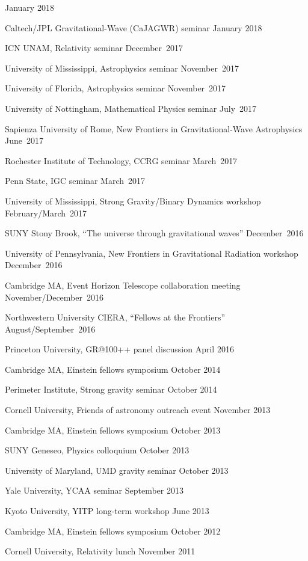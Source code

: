 \begin{etaremune}
  \hfill{}
  January 2018
\item
  Caltech/JPL Gravitational-Wave (CaJAGWR) seminar
  \hfill{}
  January 2018
\item
  ICN UNAM,
  Relativity seminar
  \hfill{}
  December~2017
\item
  University of Mississippi,
  Astrophysics seminar
  \hfill{}
  November~2017
\item
  University of Florida,
  Astrophysics seminar
  \hfill{}
  November~2017
\item
  University of Nottingham,
  Mathematical Physics seminar
  \hfill{}
  July~2017
\item
  Sapienza University of Rome,
  New Frontiers in Gravitational-Wave Astrophysics
  \hfill{}
  June~2017
\item
  Rochester Institute of Technology,
  CCRG seminar
  \hfill{}
  March~2017
\item
  Penn State,
  IGC seminar
  \hfill{}
  March~2017
\item
  University of Mississippi,
  Strong Gravity/Binary Dynamics workshop
  \hfill{}
  February/March~2017
\item
  SUNY Stony Brook,
  ``The universe through gravitational waves''
  \hfill{}
  December~2016
\item
  University of Pennsylvania,
  New Frontiers in Gravitational Radiation workshop
  \hfill{}
  December~2016
\item
  Cambridge MA,
  Event Horizon Telescope collaboration meeting
  \hfill{}
  November/December~2016
\item
  Northwestern University CIERA,
  ``Fellows at the Frontiers''
  \hfill{}
  August/September~2016
\item
  Princeton University,
  GR@100++ panel discussion
  \hfill{}
  April 2016
\item
  Cambridge MA,
  Einstein fellows symposium
  \hfill{}
  October 2014
\item
  Perimeter Institute,
  Strong gravity seminar
  \hfill{}
  October 2014
\item
  Cornell University,
  Friends of astronomy outreach event
  \hfill{}
  November 2013
\item
  Cambridge MA,
  Einstein fellows symposium
  \hfill{}
  October 2013
\item
  SUNY Geneseo,
  Physics colloquium
  \hfill{}
  October 2013
\item
  University of Maryland,
  UMD gravity seminar
  \hfill{}
  October 2013
\item
  Yale University,
  YCAA seminar
  \hfill{}
  September 2013
\item
  Kyoto University,
  YITP long-term workshop
  \hfill{}
  June 2013
\item
  Cambridge MA,
  Einstein fellows symposium
  \hfill{}
  October 2012
\item
  Cornell University,
  Relativity lunch
  \hfill{}
  November 2011
\end{etaremune}

